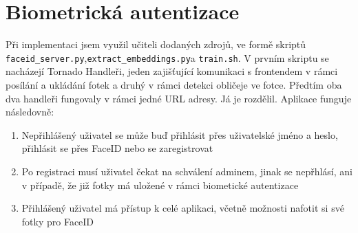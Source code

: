 \section{Biometrická autentizace}
Při implementaci jsem využil učiteli dodaných zdrojů, ve formě skriptů \verb|faceid_server.py|,\newline \verb|extract_embeddings.py|a \verb|train.sh|.
V prvním skriptu se nacházejí Tornado Handleři, jeden zajišťující komunikaci s frontendem v rámci posílání a ukládání fotek a druhý v rámci detekci obličeje ve fotce.
Předtím oba dva handleři fungovaly v rámci jedné URL adresy. Já je rozdělil. Aplikace funguje následovně:
\begin{enumerate}
    \item Nepřihlášený uživatel se může buď přihlásit přes uživatelské jméno a heslo, přihlásit se přes FaceID nebo se zaregistrovat
    \item Po registraci musí uživatel čekat na schválení adminem, jinak se nepřhlásí, ani v případě, že již fotky má uložené v rámci biometické autentizace
    \item Přihlášený uživatel má přístup k celé aplikaci, včetně možnosti nafotit si své fotky pro FaceID
\end{enumerate} 